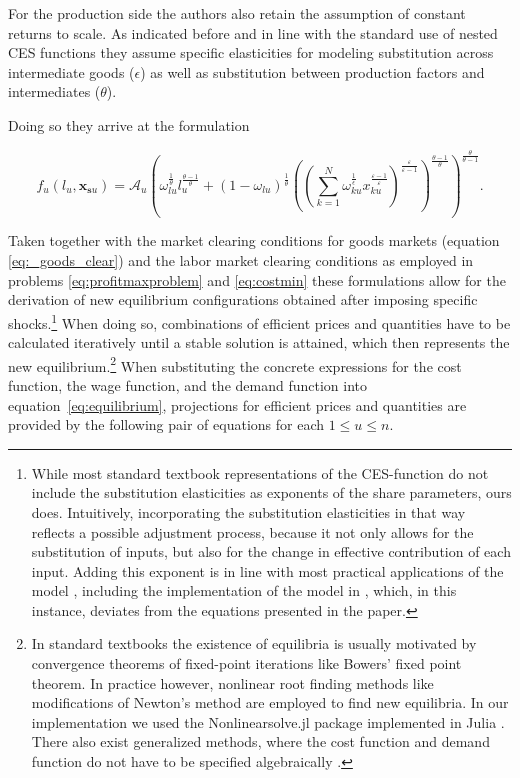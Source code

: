 \documentclass{article}
\begin{document}
For the production side the authors also retain the assumption of constant returns to scale. As indicated before and in line with the standard use of nested CES functions they assume specific elasticities for modeling substitution across intermediate goods ($\epsilon$) as well as substitution between production factors and intermediates ($\theta$). 

Doing so they arrive at the formulation

\begin{equation}
    \label{eq:cesprodfun}
    f_u(l_u, \mathbf x_{\mathbf{s} u}) =  \mathcal A_u \left(\omega_{lu}^{\frac{1}{\theta}} l_u^{\frac {\theta-1}{\theta}} + (1- \omega_{lu})^{\frac{1}{\theta}} \left( \left(\sum_{k=1}^N \omega_{ku}^{\frac{1}{\epsilon}} x_{ku}^{\frac{\varepsilon - 1}{\varepsilon}} \right)^{\frac{\varepsilon}{\varepsilon - 1}} \right)^{\frac{\theta-1}{\theta}} \right)^{\frac{\theta}{\theta - 1}}.
\end{equation}

Taken together with the market clearing conditions for goods markets (equation \eqref{eq:_goods_clear}) and the labor market clearing conditions as employed in problems \eqref{eq:profitmaxproblem} and \eqref{eq:costmin} these formulations allow for the derivation of new equilibrium configurations obtained after imposing specific shocks.\footnote{While most standard textbook representations of the CES-function do not include the substitution elasticities as exponents of the share parameters, ours does. Intuitively, incorporating the substitution elasticities in that way reflects a possible adjustment process, because it not only allows for the substitution of inputs, but also for the change in effective contribution of each input. Adding this exponent is in line with most practical applications of the model \citep[e.g.][]{Kim.2017}, including the implementation of the model in \cite{BF2019}, which, in this instance, deviates from the equations presented in the paper.} When doing so, combinations of efficient prices and quantities have to be calculated iteratively until a stable solution is attained, which then represents the new equilibrium.\footnote{In standard textbooks \citep[e.g.][]{cardeneteAppliedGeneralEquilibrium2017} the existence of equilibria is usually motivated by convergence theorems of fixed-point iterations like Bowers' fixed point theorem. In practice however, nonlinear root finding methods like modifications of Newton's method are employed to find new equilibria. In our implementation we used the Nonlinearsolve.jl package \citep[][]{palNonlinearSolvejlHighPerformanceRobust2025} implemented in Julia \citep{bezansonJuliaFreshApproach2017}. There also exist generalized methods, where the cost function and demand function do not have to be specified algebraically \citep[e.g.][]{choiComplementarityApproachSolving2014}.} When substituting the concrete expressions for the cost function, the wage function, and the demand function into equation~\eqref{eq:equilibrium}, projections for efficient prices and quantities are provided by the following pair of equations for each $1 \leq u \leq n$.
\end{document}
